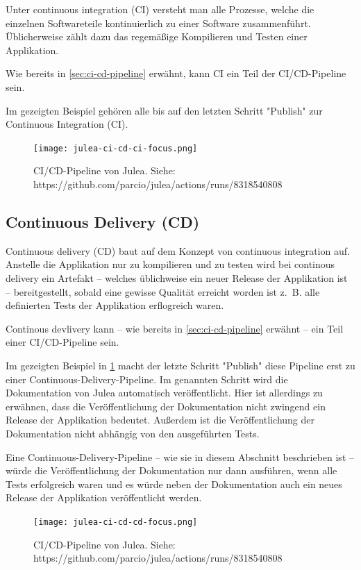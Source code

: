 Unter continuous integration (CI) versteht man alle Prozesse, welche die einzelnen Softwareteile kontinuierlich zu einer Software zusammenführt. Üblicherweise zählt dazu das regemäßige Kompilieren und Testen einer Applikation.

Wie bereits in \cref{sec:ci-cd-pipeline} erwähnt, kann CI ein Teil der CI/CD-Pipeline sein.

Im gezeigten Beispiel gehören alle bis auf den letzten Schritt "Publish" zur Continuous Integration (CI).

\begin{figure}[H]
    \texttt{[image: julea-ci-cd-ci-focus.png]}
    \caption{CI/CD-Pipeline von Julea. \newline
        Siehe: https://github.com/parcio/julea/actions/runs/8318540808}
\end{figure}

\pagebreak

\subsection{Continuous Delivery (CD)}

Continuous delivery (CD) baut auf dem Konzept von continuous integration auf. Anstelle die Applikation nur zu kompilieren und zu testen wird bei continous delivery ein Artefakt – welches üblichweise ein neuer Release der Applikation ist – bereitgestellt, sobald eine gewisse Qualität erreicht worden ist z. B. alle definierten Tests der Applikation erflogreich waren. 

Continous devlivery kann – wie bereits in \cref{sec:ci-cd-pipeline} erwähnt – ein Teil einer CI/CD-Pipeline sein. 

Im gezeigten Beispiel in \cref{fig:julea-ci-cd-cd-focus} macht der letzte Schritt "Publish" diese Pipeline erst zu einer Continuous-Delivery-Pipeline. Im genannten Schritt wird die Dokumentation von Julea automatisch veröffentlicht. Hier ist allerdings zu erwähnen, dass die Veröffentlichung der Dokumentation nicht zwingend ein Release der Applikation bedeutet. Außerdem ist die Veröffentlichung der Dokumentation nicht abhängig von den ausgeführten Tests. 

Eine Continuous-Delivery-Pipeline – wie sie in diesem Abschnitt beschrieben ist – würde die Veröffentlichung der Dokumentation nur dann ausführen, wenn alle Tests erfolgreich waren und es würde neben der Dokumentation auch ein neues Release der Applikation veröffentlicht werden.

\begin{figure}[H]
    \texttt{[image: julea-ci-cd-cd-focus.png]}
    \caption{CI/CD-Pipeline von Julea. \newline
        Siehe: https://github.com/parcio/julea/actions/runs/8318540808}
    \label{fig:julea-ci-cd-cd-focus}
\end{figure}

